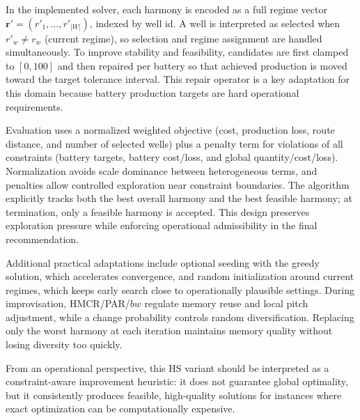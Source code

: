 \documentclass[a4paper,11pt]{article}
\begin{document}
In the implemented solver, each harmony is encoded as a full regime vector $\mathbf{r}'=(r'_1,\dots,r'_{|W|})$, indexed by well id. A well is interpreted as selected when $r'_w \neq r_w$ (current regime), so selection and regime assignment are handled simultaneously. To improve stability and feasibility, candidates are first clamped to $[0,100]$ and then repaired per battery so that achieved production is moved toward the target tolerance interval. This repair operator is a key adaptation for this domain because battery production targets are hard operational requirements.  

Evaluation uses a normalized weighted objective (cost, production loss, route distance, and number of selected wells) plus a penalty term for violations of all constraints (battery targets, battery cost/loss, and global quantity/cost/loss). Normalization avoids scale dominance between heterogeneous terms, and penalties allow controlled exploration near constraint boundaries. The algorithm explicitly tracks both the best overall harmony and the best feasible harmony; at termination, only a feasible harmony is accepted. This design preserves exploration pressure while enforcing operational admissibility in the final recommendation.  

Additional practical adaptations include optional seeding with the greedy solution, which accelerates convergence, and random initialization around current regimes, which keeps early search close to operationally plausible settings. During improvisation, HMCR/PAR/$bw$ regulate memory reuse and local pitch adjustment, while a change probability controls random diversification. Replacing only the worst harmony at each iteration maintains memory quality without losing diversity too quickly.  

From an operational perspective, this HS variant should be interpreted as a constraint-aware improvement heuristic: it does not guarantee global optimality, but it consistently produces feasible, high-quality solutions for instances where exact optimization can be computationally expensive.


\end{document}
